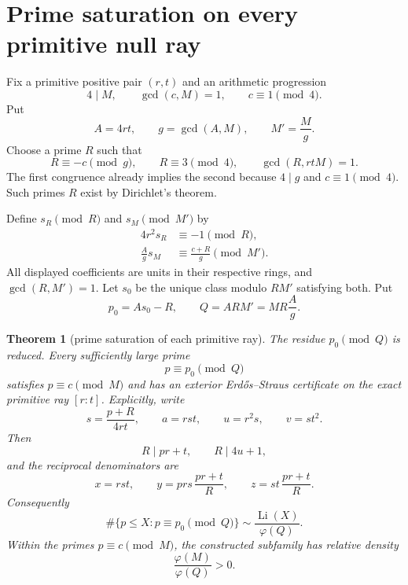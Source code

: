 \documentclass[11pt]{article}
\newtheorem{theorem}{Theorem}[section]
\theoremstyle{definition}
\theoremstyle{remark}
\newcommand{\Li}{\operatorname{Li}}
\newcommand{\1}{\mathbf 1}
\begin{document}
\section{Prime saturation on every primitive null ray}

Fix a primitive positive pair $(r,t)$ and an arithmetic progression
\begin{equation}\label{eq:M-c}
 4\mid M,\qquad \gcd(c,M)=1,\qquad c\equiv1\pmod4.
\end{equation}
Put
\begin{equation}\label{eq:A-g}
 A=4rt,
 \qquad g=\gcd(A,M),
 \qquad M'=\frac Mg.
\end{equation}
Choose a prime $R$ such that
\begin{equation}\label{eq:R-choice}
 R\equiv-c\pmod g,
 \qquad R\equiv3\pmod4,
 \qquad \gcd(R,rtM)=1.
\end{equation}
The first congruence already implies the second because $4\mid g$ and
$c\equiv1\pmod4$.  Such primes $R$ exist by Dirichlet's theorem.

Define $s_R\pmod R$ and $s_M\pmod{M'}$ by
\begin{align}
 4r^2s_R&\equiv-1\pmod R,\label{eq:sR}\\
 \frac Ags_M&\equiv\frac{c+R}{g}\pmod{M'}.
 \label{eq:sM}
\end{align}
All displayed coefficients are units in their respective rings, and
$\gcd(R,M')=1$.  Let $s_0$ be the unique class modulo $RM'$ satisfying both.
Put
\begin{equation}\label{eq:p-progression}
 p_0=As_0-R,
 \qquad
 Q=ARM'=MR\frac Ag.
\end{equation}

\begin{theorem}[prime saturation of each primitive ray]\label{thm:prime-saturation}
The residue $p_0\pmod Q$ is reduced.  Every sufficiently large prime
\begin{equation}\label{eq:p-AP}
 p\equiv p_0\pmod Q
\end{equation}
satisfies $p\equiv c\pmod M$ and has an exterior Erdős--Straus certificate on
the exact primitive ray $[r:t]$.  Explicitly, write
\begin{equation}\label{eq:s-from-p}
 s=\frac{p+R}{4rt},
 \qquad
 a=rst,
 \qquad
 u=r^2s,
 \qquad
 v=st^2.
\end{equation}
Then
\begin{equation}\label{eq:E-ray-incidence}
 R\mid pr+t,
 \qquad
 R\mid4u+1,
\end{equation}
and the reciprocal denominators are
\begin{equation}\label{eq:E-denominators}
 \boxed{
 x=rst,
 \qquad
 y=prs\,\frac{pr+t}{R},
 \qquad
 z=st\,\frac{pr+t}{R}.}
\end{equation}
Consequently
\begin{equation}\label{eq:PNT-ray}
 \#\{p\le X:p\equiv p_0\pmod Q\}
 \sim\frac{\Li(X)}{\varphi(Q)}.
\end{equation}
Within the primes $p\equiv c\pmod M$, the constructed subfamily has relative
density
\begin{equation}\label{eq:relative-density}
 \frac{\varphi(M)}{\varphi(Q)}>0.
\end{equation}
\end{theorem}
\end{document}
